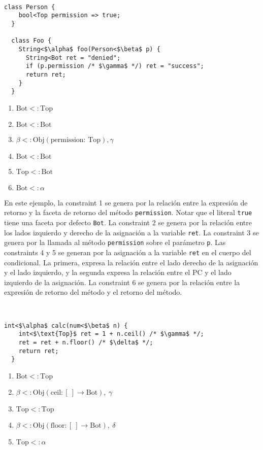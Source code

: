 \begin{ej}\ \\
  \normalfont
  \label{gen2}
\begin{lstlisting}[mathescape=true]
  class Person {
    bool<Top permission => true;
  }

  class Foo {
    String<$\alpha$ foo(Person<$\beta$ p) {
      String<Bot ret = "denied";
      if (p.permission /* $\gamma$ */) ret = "success";
      return ret;
    }
  }
\end{lstlisting}

\begin{enumerate}
  \item $\text{Bot} <: \text{Top}$
  \item $\text{Bot} <: \text{Bot}$
  \item $\beta <:\text{Obj}(\text{permission: }\text{Top}), \gamma$
  \item $\text{Bot} <: \text{Bot}$
  \item $\text{Top} <: \text{Bot}$
  \item $\text{Bot} <: \alpha$
\end{enumerate}
\end{ej}

En este ejemplo, la constraint 1 se genera por la relación entre la expresión de retorno y la faceta de retorno del método \texttt{permission}. Notar que el literal \texttt{true} tiene una faceta por defecto \texttt{Bot}. La constraint 2 se genera por la relación entre los lados izquierdo y derecho de la asignación a la variable \texttt{ret}. La constraint 3 se genera por la llamada al método \texttt{permission} sobre el parámetro \texttt{p}. Las constraints 4 y 5 se generan por la asignación a la variable \texttt{ret} en el cuerpo del condicional. La primera, expresa la relación entre el lado derecho de la asignación y el lado izquierdo, y la segunda expresa la relación entre el PC y el lado izquierdo de la asignación. La constraint 6 se genera por la relación entre la expresión de retorno del método y el retorno del método.

\begin{ej}\ \\
  \normalfont
  \label{gen3}
\begin{lstlisting}[mathescape=true]
  int<$\alpha$ calc(num<$\beta$ n) {
    int<$\text{Top}$ ret = 1 + n.ceil() /* $\gamma$ */;
    ret = ret + n.floor() /* $\delta$ */;
    return ret;
  }
\end{lstlisting}

\begin{enumerate}
  \item $\text{Bot} <: \text{Top}$
  \item $\beta <: \text{Obj}(\text{ceil}: [\ ] \rightarrow \text{Bot}),\ \gamma$
  \item $\text{Top} <: \text{Top}$
  \item $\beta <: \text{Obj}(\text{floor}: [\ ] \rightarrow \text{Bot}),\ \delta$
  \item $\text{Top} <: \alpha$
\end{enumerate}
\end{ej}

